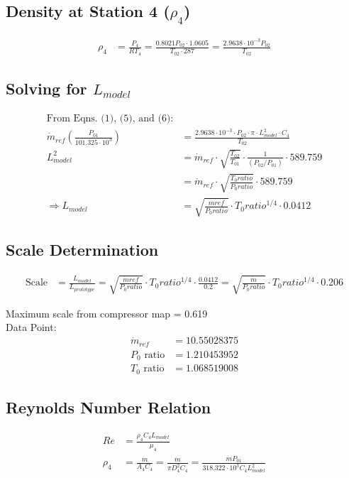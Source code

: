 \documentclass[12pt,a4paper]{article}
\begin{document}
\subsection*{Density at Station 4 ($\rho_4$)}
\begin{align*}
\rho_4 &= \frac{P_4}{RT_4} = \frac{0.8021 P_{02} \cdot 1.0605}{T_{02} \cdot 287} = \frac{2.9638 \cdot 10^{-3} P_{02}}{T_{02}} \tag{6}
\end{align*}

\subsection*{Solving for $L_{model}$}
\begin{align*}
\text{From Eqns. (1), (5), and (6):} \\
\dot{m}_{ref} \left(\frac{P_{01}}{101.325 \cdot 10^3}\right) &= \frac{2.9638 \cdot 10^{-3} \cdot P_{02} \cdot \pi \cdot L_{model}^2 \cdot C_4}{T_{02}} \\
L_{model}^2 &= \dot{m}_{ref} \cdot \sqrt{\frac{T_{02}}{T_{01}}} \cdot \frac{1}{(P_{02}/P_{01})} \cdot 589.759 \\
&= \dot{m}_{ref} \cdot \sqrt{\frac{T_0ratio}{P_0ratio}} \cdot 589.759 \\
\Rightarrow L_{model} &= \sqrt{\frac{\dot{mref}}{P_0ratio}} \cdot T_0ratio^{1/4} \cdot 0.0412
\end{align*}

\subsection*{Scale Determination}
\begin{align*}
\text{Scale} &= \frac{L_{model}}{L_{prototype}} = \sqrt{\frac{\dot{m}ref}{P_0ratio}} \cdot T_0ratio^{1/4} \cdot \frac{0.0412}{0.2} = \sqrt{\frac{\dot{m}}{P_0ratio}} \cdot T_0ratio^{1/4} \cdot 0.206
\end{align*}

\noindent Maximum scale from compressor map = 0.619 \\
Data Point: 
\begin{align*}
\dot{m}_{ref} &= 10.55028375 \tag{7} \\
P_0 \text{ ratio} &= 1.210453952 \tag{8} \\
T_0 \text{ ratio} &= 1.068519008 \tag{9}
\end{align*}

\subsection*{Reynolds Number Relation}
\begin{align*}
Re &= \frac{\rho_4 C_4 L_{model}}{\mu_4} \tag{10} \\
\rho_4 &= \frac{\dot{m}}{A_4 C_4} = \frac{\dot{m}}{\pi D_4^2 C_4} = \frac{\dot{m} P_{01}}{318.322 \cdot 10^3 C_4 L_{model}^2} \tag{11}
\end{align*}
\end{document}
